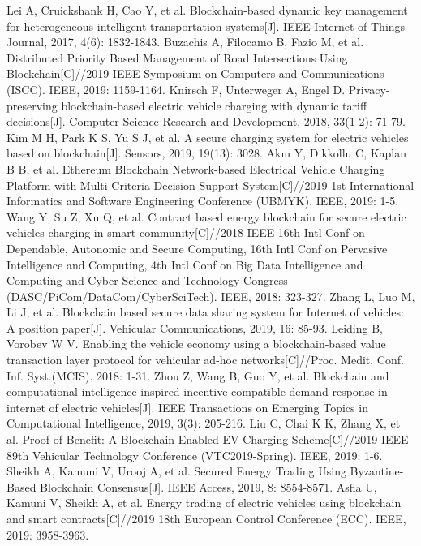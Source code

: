 \begin{thebibliography}{99}
 Lei A, Cruickshank H, Cao Y, et al. Blockchain-based dynamic key management for heterogeneous intelligent transportation systems[J]. IEEE Internet of Things Journal, 2017, 4(6): 1832-1843.
 Buzachis A, Filocamo B, Fazio M, et al. Distributed Priority Based Management of Road Intersections Using Blockchain[C]//2019 IEEE Symposium on Computers and Communications (ISCC). IEEE, 2019: 1159-1164.
 Knirsch F, Unterweger A, Engel D. Privacy-preserving blockchain-based electric vehicle charging with dynamic tariff decisions[J]. Computer Science-Research and Development, 2018, 33(1-2): 71-79.
 Kim M H, Park K S, Yu S J, et al. A secure charging system for electric vehicles based on blockchain[J]. Sensors, 2019, 19(13): 3028.
 Akın Y, Dikkollu C, Kaplan B B, et al. Ethereum Blockchain Network-based Electrical Vehicle Charging Platform with Multi-Criteria Decision Support System[C]//2019 1st International Informatics and Software Engineering Conference (UBMYK). IEEE, 2019: 1-5.
 Wang Y, Su Z, Xu Q, et al. Contract based energy blockchain for secure electric vehicles charging in smart community[C]//2018 IEEE 16th Intl Conf on Dependable, Autonomic and Secure Computing, 16th Intl Conf on Pervasive Intelligence and Computing, 4th Intl Conf on Big Data Intelligence and Computing and Cyber Science and Technology Congress (DASC/PiCom/DataCom/CyberSciTech). IEEE, 2018: 323-327.
 Zhang L, Luo M, Li J, et al. Blockchain based secure data sharing system for Internet of vehicles: A position paper[J]. Vehicular Communications, 2019, 16: 85-93.
 Leiding B, Vorobev W V. Enabling the vehicle economy using a blockchain-based value transaction layer protocol for vehicular ad-hoc networks[C]//Proc. Medit. Conf. Inf. Syst.(MCIS). 2018: 1-31.
 Zhou Z, Wang B, Guo Y, et al. Blockchain and computational intelligence inspired incentive-compatible demand response in internet of electric vehicles[J]. IEEE Transactions on Emerging Topics in Computational Intelligence, 2019, 3(3): 205-216.
 Liu C, Chai K K, Zhang X, et al. Proof-of-Benefit: A Blockchain-Enabled EV Charging Scheme[C]//2019 IEEE 89th Vehicular Technology Conference (VTC2019-Spring). IEEE, 2019: 1-6.
 Sheikh A, Kamuni V, Urooj A, et al. Secured Energy Trading Using Byzantine-Based Blockchain Consensus[J]. IEEE Access, 2019, 8: 8554-8571.
 Asfia U, Kamuni V, Sheikh A, et al. Energy trading of electric vehicles using blockchain and smart contracts[C]//2019 18th European Control Conference (ECC). IEEE, 2019: 3958-3963.

\end{thebibliography}
